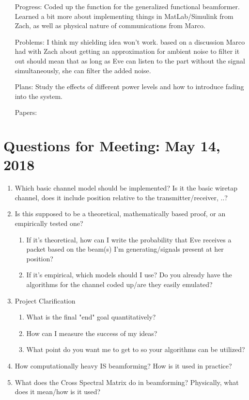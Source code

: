 \documentclass[11pt]{article}
\begin{document}
\begin{itemize}
\item[Progress:]
Coded up the function for the generalized functional beamformer.  Learned a bit more about implementing things in MatLab/Simulink from Zach, as well as physical nature of communications from Marco.

\item[Problems:]
I think my shielding idea won't work.  based on a discussion Marco had with Zach about getting an approximation for ambient noise to filter it out should mean that as long as Eve can listen to the part without the signal simultaneously, she can filter the added noise.

\item[Plans:]
Study the effects of different power levels and how to introduce fading into the system.

\item[Papers:]


\end{itemize}
\newpage

\section{Questions for Meeting: May 14, 2018}
\begin{enumerate}
\item Which basic channel model should be implemented?  Is it the basic wiretap channel, does it include position relative to the transmitter/receiver, ..?
\item Is this supposed to be a theoretical, mathematically based proof, or an empirically tested one?
\begin{enumerate}
\item If it's theoretical, how can I write the probability that Eve receives a packet based on the beam(s) I'm generating/signals present at her position?
\item If it's empirical, which models should I use? Do you already have the algorithms for the channel coded up/are they easily emulated?
\end{enumerate}
\item Project Clarification
\begin{enumerate}
\item What is the final "end" goal quantitatively?
\item How can I measure the success of my ideas?
\item What point do you want me to get to so your algorithms can be utilized?
\end{enumerate}
\item How computationally heavy IS beamforming?  How is it used in practice?
\item What does the Cross Spectral Matrix do in beamforming?  Physically, what does it mean/how is it used?
\end{enumerate}
\newpage
\end{document}
